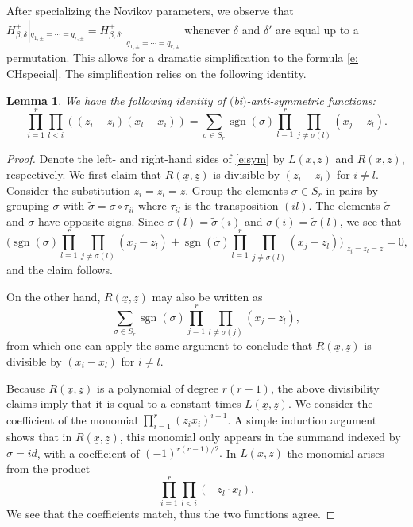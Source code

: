 \documentclass[11pt]{article}
\numberwithin{equation}{section}
\newtheorem{Lemma}[Theorem]{Lemma}
\numberwithin{equation}{section}
\newcommand{\op}[1]{\operatorname{#1}}
\newcommand{\z}{z}
\newcommand{\x}{x}
\begin{document}
After specializing the Novikov parameters, we observe that
$H^{{\pm}}_{\beta, \delta}|_{q_{1, \pm} = \cdots =q_{r, \pm}} = H^{{\pm}}_{\beta, \delta '}|_{q_{1, \pm} = \cdots =q_{r, \pm}}$
whenever $\delta$ and $\delta '$ are equal up to a permutation. This allows for a dramatic simplification to the formula \eqref{e: CHspecial}. The simplification relies on the following identity.
\begin{Lemma}\label{l:sym}
We have the following identity of $($bi$)$-anti-symmetric functions:
\begin{equation}\label{e:sym}
\prod_{i=1}^r \prod_{l<i} ((\z_i - \z_l)(\x_l - \x_i) ) = \sum_{\sigma \in S_r} \op{sgn}(\sigma) \prod_{l=1}^r \prod_{j \neq \sigma(l)} (\x_j - \z_l).
\end{equation}
\end{Lemma}

\begin{proof}
Denote the left- and right-hand sides of \eqref{e:sym} by $L(\underline x, \underline z)$ and $R(\underline x, \underline z)$, respectively.
We first claim that $R(\underline x, \underline z)$ is divisible by $(z_i - z_l)$ for $i \neq l$. Consider the substitution $z_i = z_l = z$.
Group the elements $\sigma \in S_r$ in pairs by grouping $\sigma$ with $\tilde \sigma = \sigma \circ \tau_{il}$ where $\tau_{il}$ is the transposition $(il)$. The elements $\tilde \sigma$ and $\sigma$ have opposite signs. Since $\sigma(l) = \tilde \sigma(i)$ and $\sigma(i) = \tilde \sigma(l)$, we see that
\[
\Biggl(\op{sgn}(\sigma) \prod_{l=1}^r \prod_{j \neq \sigma(l)} (\x_j - \z_l) + \op{sgn}(\tilde \sigma) \prod_{l=1}^r \prod_{j \neq \tilde \sigma(l)} (\x_j - \z_l)\Biggr)\bigg|_{z_i = z_l = z} = 0,
\]
and the claim follows.

On the other hand, $R(\underline x, \underline z)$ may also be written as
\[
\sum_{\sigma \in S_r} \op{sgn}(\sigma) \prod_{j=1}^r \prod_{l \neq \sigma(j)} (\x_j - \z_l),
\]
from which one can apply the same argument to conclude that $R(\underline x, \underline z)$ is divisible by $(x_i - x_l)$ for $i \neq l$.

Because $R(\underline x, \underline z)$ is a polynomial of degree $r(r-1)$, the above divisibility claims imply that it is equal to a constant times $L(\underline x, \underline z)$. We consider the coefficient of the monomial
$\prod_{i=1}^r (z_i x_i)^{i-1}$. A simple induction argument shows that in $R(\underline x, \underline z)$, this monomial only appears in the summand indexed by $\sigma = id$, with a coefficient of $(-1)^{r(r-1)/2}.$ In $L(\underline x, \underline z)$ the monomial arises from the product
\[
\prod_{i=1}^r \prod_{l<i} (- \z_l \cdot \x_l ).
\]
We see that the coefficients match, thus the two functions agree.
\end{proof}
\end{document}
